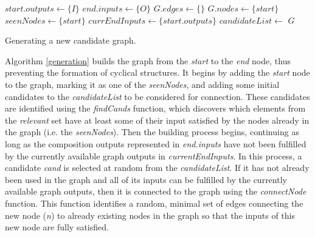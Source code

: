 \documentclass{article}
\begin{document}
\begin{algorithm}[h]
 \setlength{}
 \LinesNumbered
 \SetNlSty{}{}{:}
 $start.outputs \leftarrow \{I\}$\;
 $end.inputs \leftarrow \{O\}$\;
 $G.edges \leftarrow \{\}$\;
 $G.nodes \leftarrow \{start\}$\;
 $seenNodes \leftarrow \{start\}$\;
 $currEndInputs \leftarrow \{start.outputs\}$\;
 $candidateList \leftarrow$ \;
 \;
 \;
 \KwRet $G$\;
 \vspace{2mm}
 \caption{\footnotesize Generating a new candidate graph.}
\label{generation}
\end{algorithm}

Algorithm \ref{generation} builds the graph from the \textit{start} to the \textit{end} node, thus preventing the formation of cyclical
structures. It begins by adding the \textit{start} node to the graph, marking it as one of the
\textit{seenNodes}, and adding some initial candidates to the \textit{candidateList} to be considered for connection. These candidates
are identified using the \textit{findCands} function, which discovers which elements from the \textit{relevant} set have at least some
of their input satisfied by the nodes already in the graph (i.e. the \textit{seenNodes}). Then the building process begins, continuing
as long as the composition outputs represented in \textit{end.inputs} have not been fulfilled by the currently available graph outputs
in \textit{currentEndInputs}. In this process, a candidate \textit{cand} is selected at random from the \textit{candidateList}. If
it has not already been used in the graph and all of its inputs can be fulfilled by the currently available graph outputs, then it is
connected to the graph using the \textit{connectNode} function. This function identifies a random, minimal set of edges connecting the
new node (\textit{n}) to already existing nodes in the graph so that the inputs of this new node are fully satisfied.
\end{document}

